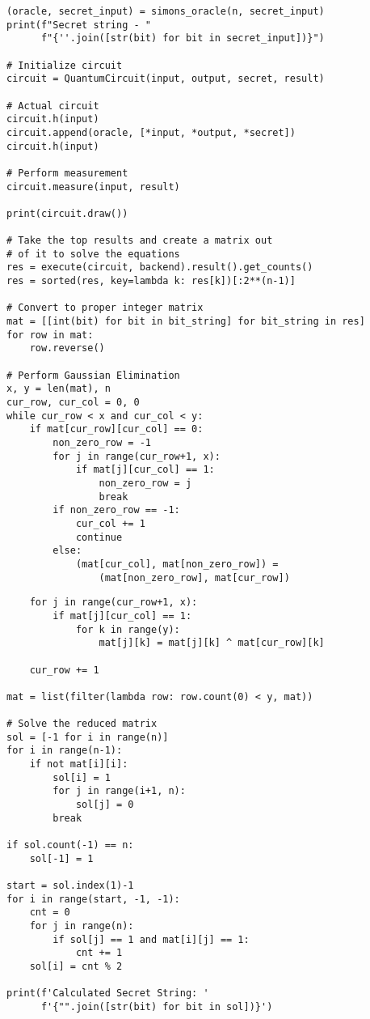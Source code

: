 \documentclass[13pt]{article}
\begin{document}
\begin{tcolorbox}[
    enhanced,
    attach boxed title to top left={xshift=6mm,yshift=-3mm},
    title=Simon's Algorithm Code,
    boxed title style={size=small,sharp corners},
    sharp corners,
]
\begin{verbatim}
(oracle, secret_input) = simons_oracle(n, secret_input)
print(f"Secret string - "
      f"{''.join([str(bit) for bit in secret_input])}")

# Initialize circuit
circuit = QuantumCircuit(input, output, secret, result)

# Actual circuit
circuit.h(input)
circuit.append(oracle, [*input, *output, *secret])
circuit.h(input)

# Perform measurement
circuit.measure(input, result)

print(circuit.draw())

# Take the top results and create a matrix out
# of it to solve the equations
res = execute(circuit, backend).result().get_counts()
res = sorted(res, key=lambda k: res[k])[:2**(n-1)]

# Convert to proper integer matrix
mat = [[int(bit) for bit in bit_string] for bit_string in res]
for row in mat:
    row.reverse()

# Perform Gaussian Elimination
x, y = len(mat), n
cur_row, cur_col = 0, 0
while cur_row < x and cur_col < y:
    if mat[cur_row][cur_col] == 0:
        non_zero_row = -1
        for j in range(cur_row+1, x):
            if mat[j][cur_col] == 1:
                non_zero_row = j
                break
        if non_zero_row == -1:
            cur_col += 1
            continue
        else:
            (mat[cur_col], mat[non_zero_row]) =
                (mat[non_zero_row], mat[cur_row])
\end{verbatim}
\end{tcolorbox}
\begin{tcolorbox}[
    enhanced,
    attach boxed title to top left={xshift=6mm,yshift=-3mm},
    title=Simon's Algorithm Code,
    boxed title style={size=small,sharp corners},
    sharp corners,
]
\begin{verbatim}
    for j in range(cur_row+1, x):
        if mat[j][cur_col] == 1:
            for k in range(y):
                mat[j][k] = mat[j][k] ^ mat[cur_row][k]

    cur_row += 1

mat = list(filter(lambda row: row.count(0) < y, mat))

# Solve the reduced matrix
sol = [-1 for i in range(n)]
for i in range(n-1):
    if not mat[i][i]:
        sol[i] = 1
        for j in range(i+1, n):
            sol[j] = 0
        break

if sol.count(-1) == n:
    sol[-1] = 1

start = sol.index(1)-1
for i in range(start, -1, -1):
    cnt = 0
    for j in range(n):
        if sol[j] == 1 and mat[i][j] == 1:
            cnt += 1
    sol[i] = cnt % 2

print(f'Calculated Secret String: '
      f'{"".join([str(bit) for bit in sol])}')
\end{verbatim}
\end{tcolorbox}
\end{document}

